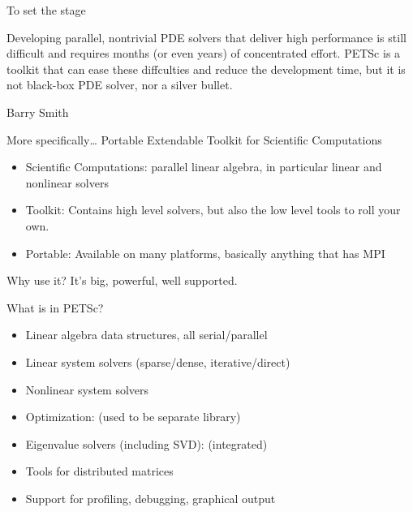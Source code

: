 
\begin{numberedframe}{To set the stage}

  Developing parallel, nontrivial PDE solvers that
  deliver high performance is still difficult and requires months (or
  even years) of concentrated effort.  PETSc is a toolkit that can
  ease these diffculties and reduce the development time, but it is not
  black-box PDE solver, nor a silver bullet.

  Barry Smith
\end{numberedframe}

\begin{numberedframe}{More specifically\ldots}
Portable Extendable Toolkit for Scientific Computations
\begin{itemize}
\item Scientific Computations: parallel linear algebra, in particular
  linear and nonlinear solvers
\item Toolkit: Contains high level solvers, but also the low level tools
  to roll your own.
\item Portable: Available on many platforms, basically anything that has MPI
\end{itemize}

Why use it? It's big, powerful, well supported.
\end{numberedframe}

\begin{numberedframe}{What is in PETSc?}
  \begin{itemize}
  \item Linear algebra data structures, all serial/parallel
  \item Linear system solvers (sparse/dense, iterative/direct)
  \item Nonlinear system solvers
  \item Optimization:  (used to be separate library)
  \item Eigenvalue solvers (including SVD):  (integrated)
  \item Tools for distributed matrices
  \item Support for profiling, debugging, graphical output
  \end{itemize}
\end{numberedframe}

